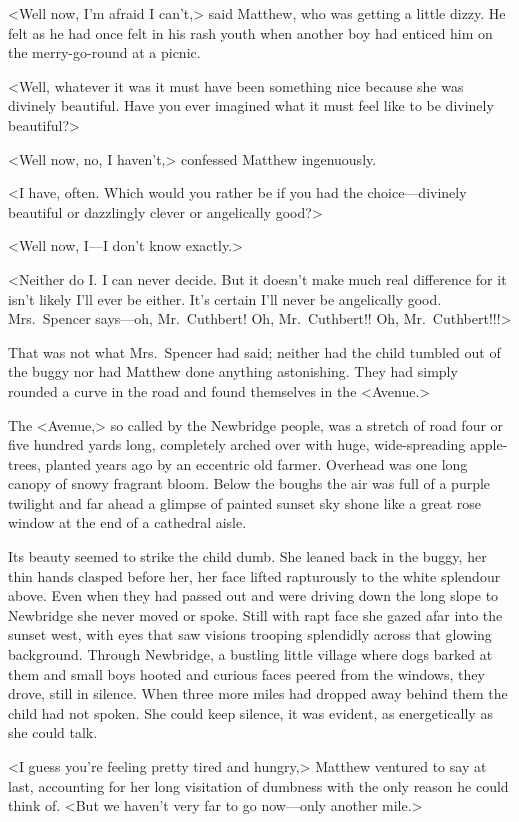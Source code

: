 <Well now, I'm afraid I can't,> said Matthew, who was getting a little dizzy. He felt as he had once felt in his rash youth when another boy had enticed him on the merry-go-round at a picnic.

<Well, whatever it was it must have been something nice because she was divinely beautiful. Have you ever imagined what it must feel like to be divinely beautiful?>

<Well now, no, I haven't,> confessed Matthew ingenuously.

<I have, often. Which would you rather be if you had the choice—divinely beautiful or dazzlingly clever or angelically good?>

<Well now, I—I don't know exactly.>

<Neither do I\@. I can never decide. But it doesn't make much real difference for it isn't likely I'll ever be either. It's certain I'll never be angelically good. Mrs.~Spencer says—oh, Mr.~Cuthbert! Oh, Mr.~Cuthbert!! Oh, Mr.~Cuthbert!!!>

That was not what Mrs.~Spencer had said; neither had the child tumbled out of the buggy nor had Matthew done anything astonishing. They had simply rounded a curve in the road and found themselves in the <Avenue.>

The <Avenue,> so called by the Newbridge people, was a stretch of road four or five hundred yards long, completely arched over with huge, wide-spreading apple-trees, planted years ago by an eccentric old farmer. Overhead was one long canopy of snowy fragrant bloom. Below the boughs the air was full of a purple twilight and far ahead a glimpse of painted sunset sky shone like a great rose window at the end of a cathedral aisle.

Its beauty seemed to strike the child dumb. She leaned back in the buggy, her thin hands clasped before her, her face lifted rapturously to the white splendour above. Even when they had passed out and were driving down the long slope to Newbridge she never moved or spoke. Still with rapt face she gazed afar into the sunset west, with eyes that saw visions trooping splendidly across that glowing background. Through Newbridge, a bustling little village where dogs barked at them and small boys hooted and curious faces peered from the windows, they drove, still in silence. When three more miles had dropped away behind them the child had not spoken. She could keep silence, it was evident, as energetically as she could talk.

<I guess you're feeling pretty tired and hungry,> Matthew ventured to say at last, accounting for her long visitation of dumbness with the only reason he could think of. <But we haven't very far to go now—only another mile.>

